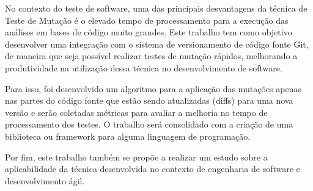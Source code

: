 No contexto do teste de software, uma das principais desvantagens da técnica de Teste de Mutação é o elevado tempo de processamento para a execução das análises em bases de código muito grandes. Este trabalho tem como objetivo desenvolver uma integração com o sistema de versionamento de código fonte Git, de maneira que seja possível realizar testes de mutação rápidos, melhorando a produtividade na utilização dessa técnica no desenvolvimento de software.

Para isso, foi desenvolvido um algoritmo para a aplicação das mutações apenas nas partes do código fonte que estão sendo atualizadas (diffs) para uma nova versão e serão coletadas métricas para avaliar a melhoria no tempo de processamento dos testes. O trabalho será consolidado com a criação de uma biblioteca ou framework para alguma linguagem de programação.

Por fim, este trabalho também se propõe a realizar um estudo sobre a aplicabilidade da técnica desenvolvida no contexto de engenharia de software e desenvolvimento ágil.
